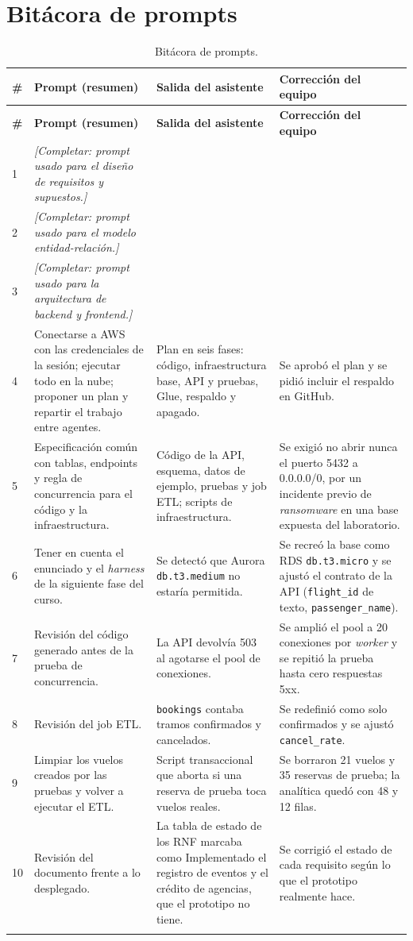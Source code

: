 \documentclass[10pt,letterpaper]{article}
\begin{document}
\appendix
\section{Bitácora de prompts}
\label{sec:prompts}
\begin{longtable}{@{}L{1.2cm} L{5.4cm} L{4.2cm} L{4.4cm}@{}}
\toprule
\textbf{\#} & \textbf{Prompt (resumen)} & \textbf{Salida del asistente} & \textbf{Corrección del equipo} \\
\midrule
\endfirsthead
\toprule
\textbf{\#} & \textbf{Prompt (resumen)} & \textbf{Salida del asistente} & \textbf{Corrección del equipo} \\
\midrule
{} & \textit{[Completar: prompt usado para el diseño de requisitos y supuestos.]} & & \\
2 & \textit{[Completar: prompt usado para el modelo entidad-relación.]} & & \\
3 & \textit{[Completar: prompt usado para la arquitectura de backend y frontend.]} & & \\
4 & Conectarse a AWS con las credenciales de la sesión; ejecutar todo en la nube; proponer un plan y repartir el trabajo entre agentes. & Plan en seis fases: código, infraestructura base, API y pruebas, Glue, respaldo y apagado. & Se aprobó el plan y se pidió incluir el respaldo en GitHub. \\
5 & Especificación común con tablas, endpoints y regla de concurrencia para el código y la infraestructura. & Código de la API, esquema, datos de ejemplo, pruebas y job ETL; scripts de infraestructura. & Se exigió no abrir nunca el puerto 5432 a 0.0.0.0/0, por un incidente previo de \emph{ransomware} en una base expuesta del laboratorio. \\
6 & Tener en cuenta el enunciado y el \emph{harness} de la siguiente fase del curso. & Se detectó que Aurora \texttt{db.t3.medium} no estaría permitida. & Se recreó la base como RDS \texttt{db.t3.micro} y se ajustó el contrato de la API (\texttt{flight\_id} de texto, \texttt{passenger\_name}). \\
7 & Revisión del código generado antes de la prueba de concurrencia. & La API devolvía 503 al agotarse el pool de conexiones. & Se amplió el pool a 20 conexiones por \emph{worker} y se repitió la prueba hasta cero respuestas 5xx. \\
8 & Revisión del job ETL. & \texttt{bookings} contaba tramos confirmados y cancelados. & Se redefinió como solo confirmados y se ajustó \texttt{cancel\_rate}. \\
9 & Limpiar los vuelos creados por las pruebas y volver a ejecutar el ETL. & Script transaccional que aborta si una reserva de prueba toca vuelos reales. & Se borraron 21 vuelos y 35 reservas de prueba; la analítica quedó con 48 y 12 filas. \\
10 & Revisión del documento frente a lo desplegado. & La tabla de estado de los RNF marcaba como Implementado el registro de eventos y el crédito de agencias, que el prototipo no tiene. & Se corrigió el estado de cada requisito según lo que el prototipo realmente hace. \\
\bottomrule
\caption{Bitácora de prompts.}
\end{longtable}
\end{document}
